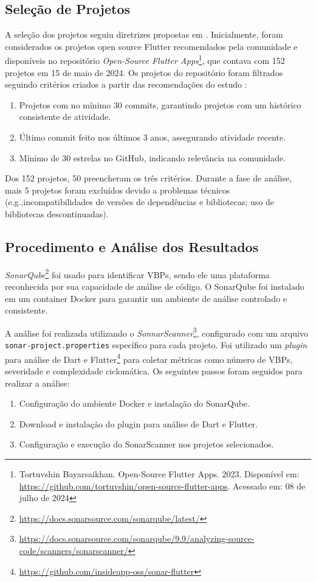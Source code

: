 \documentclass[12pt]{article}
\begin{document}
\subsection{Seleção de Projetos}
A seleção dos projetos seguiu diretrizes propostas em \cite{baltes2022sampling}. Inicialmente, foram considerados os projetos open source Flutter recomendados pela comunidade e disponíveis no repositório \textit{Open-Source Flutter Apps}\footnote{Tortuvshin Bayarsaikhan. Open-Source Flutter Apps. 2023. Disponível em: \url{https://github.com/tortuvshin/open-source-flutter-apps}. Acessado em: 08 de julho de 2024}, que contava com 152 projetos em 15 de maio de 2024. Os projetos do repositório foram filtrados seguindo critérios criados a partir das recomendações do estudo \cite{kalliamvakou2016depth}:
\begin{enumerate}
    \item Projetos com no mínimo 30 commits, garantindo projetos com um histórico consistente de atividade.
    \item Último commit feito nos últimos 3 anos, assegurando atividade recente.
    \item Mínimo de 30 estrelas no GitHub, indicando relevância na comunidade.
\end{enumerate}

Dos 152 projetos, 50 preencheram os três critérios. Durante a fase de análise, mais 5 projetos foram excluídos devido a problemas técnicos (e.g.,incompatibilidades de versões de dependências e bibliotecas; uso de bibliotecas descontinuadas).


\subsection{Procedimento e Análise dos Resultados}
\textit{SonarQube}\footnote{\url{https://docs.sonarsource.com/sonarqube/latest/}} foi usado para identificar VBPs, sendo ele uma plataforma reconhecida por sua capacidade de análise de código\cite{marcilio2019static}. O SonarQube foi instalado em um container Docker para garantir um ambiente de análise controlado e consistente.

A análise foi realizada utilizando o \textit{SonnarScanner}\footnote{\url{https://docs.sonarsource.com/sonarqube/9.9/analyzing-source-code/scanners/sonarscanner/}}, configurado com um arquivo \texttt{sonar-project.properties} específico para cada projeto. Foi utilizado um \textit{plugin} para análise de Dart e Flutter\footnote{\url{https://github.com/insideapp-oss/sonar-flutter}} para coletar métricas como número de VBPs, severidade e complexidade ciclomática. Os seguintes passos foram seguidos para realizar a análise:
\begin{enumerate}
    \item Configuração do ambiente Docker e instalação do SonarQube.
    \item Download e instalação do plugin para análise de Dart e Flutter.
    \item Configuração e execução do SonarScanner nos projetos selecionados.
\end{enumerate}
\end{document}
